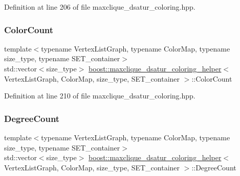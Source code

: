 Definition at line 206 of file maxclique\+\_\+dsatur\+\_\+coloring.\+hpp.

\mbox{\label{classboost_1_1maxclique__dsatur__coloring__helper_ac74b872f20e7feeaecb8ba1c69be579e}} 
\subsubsection{\texorpdfstring{Color\+Count}{ColorCount}}
{\footnotesize\ttfamily template$<$typename Vertex\+List\+Graph, typename Color\+Map, typename size\+\_\+type, typename S\+E\+T\+\_\+container$>$ \\
std\+::vector$<$size\+\_\+type$>$ \hyperlink{classboost_1_1maxclique__dsatur__coloring__helper}{boost\+::maxclique\+\_\+dsatur\+\_\+coloring\+\_\+helper}$<$ Vertex\+List\+Graph, Color\+Map, size\+\_\+type, S\+E\+T\+\_\+container $>$\+::Color\+Count\hspace{0.3cm}{\ttfamily [private]}}



Definition at line 210 of file maxclique\+\_\+dsatur\+\_\+coloring.\+hpp.

\mbox{\label{classboost_1_1maxclique__dsatur__coloring__helper_a00bf4408982a3547d654e661079c9f4b}} 
\subsubsection{\texorpdfstring{Degree\+Count}{DegreeCount}}
{\footnotesize\ttfamily template$<$typename Vertex\+List\+Graph, typename Color\+Map, typename size\+\_\+type, typename S\+E\+T\+\_\+container$>$ \\
std\+::vector$<$size\+\_\+type$>$ \hyperlink{classboost_1_1maxclique__dsatur__coloring__helper}{boost\+::maxclique\+\_\+dsatur\+\_\+coloring\+\_\+helper}$<$ Vertex\+List\+Graph, Color\+Map, size\+\_\+type, S\+E\+T\+\_\+container $>$\+::Degree\+Count\hspace{0.3cm}{\ttfamily [private]}}



